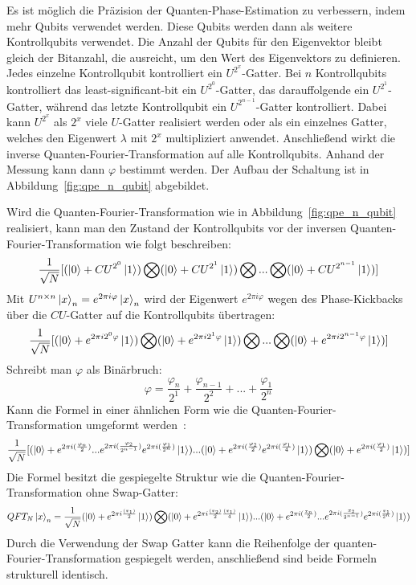 Es ist möglich die Präzision der Quanten-Phase-Estimation zu verbessern, 
indem mehr Qubits verwendet werden.
Diese Qubits werden dann als weitere Kontrollqubits verwendet.
Die Anzahl der Qubits für den Eigenvektor bleibt gleich der Bitanzahl, 
die ausreicht, um den Wert des Eigenvektors zu definieren.
Jedes einzelne Kontrollqubit kontrolliert ein \(U^{2^x}\)-Gatter.
Bei \(n\) Kontrollqubits kontrolliert das least-significant-bit ein \(U^{2^0}\)-Gatter,
das darauffolgende ein \(U^{2^1}\)-Gatter,
während das letzte Kontrollqubit ein \(U^{2^{n-1}}\)-Gatter kontrolliert.
Dabei kann \(U^{2^x}\) als \(2^x\) viele \(U\)-Gatter realisiert werden oder 
als ein einzelnes Gatter, welches den Eigenwert \(\lambda\) mit \(2^x\) multipliziert anwendet.
Anschließend wirkt die inverse Quanten-Fourier-Transformation auf alle Kontrollqubits.
Anhand der Messung kann dann \(\varphi\) bestimmt werden.
Der Aufbau der Schaltung ist in Abbildung~\ref{fig:qpe_n_qubit} abgebildet.

Wird die Quanten-Fourier-Transformation wie in Abbildung~\ref{fig:qpe_n_qubit} realisiert,
kann man den Zustand der Kontrollqubits vor der inversen Quanten-Fourier-Transformation wie folgt beschreiben:
\[\frac{1}{\sqrt{N}}[
  (\ket{0} + CU^{2^0}\ket{1}) \bigotimes
  (\ket{0} + CU^{2^1}\ket{1}) \bigotimes 
  ... \bigotimes
  (\ket{0} + CU^{2^{n-1}}\ket{1}) 
]\]
Mit \(U^{n\times n}\ket{x}_n=e^{2\pi i \varphi}\ket{x}_n\) wird der Eigenwert \(e^{2\pi i \varphi}\) wegen des Phase-Kickbacks
über die \(CU\)-Gatter auf die Kontrollqubits übertragen:
\[\frac{1}{\sqrt{N}}[
  (\ket{0} + e^{2\pi i 2^0 \varphi}\ket{1}) \bigotimes
  (\ket{0} + e^{2\pi i 2^1 \varphi}\ket{1}) \bigotimes 
  ... \bigotimes
  (\ket{0} + e^{2\pi i 2^{n-1} \varphi}\ket{1}) 
]\]
Schreibt man \(\varphi\) als Binärbruch:
\[\varphi = \frac{\varphi_n}{2^1} + \frac{\varphi_{n-1}}{2^2} + ... + \frac{\varphi_1}{2^n}\]
Kann die Formel in einer ähnlichen Form wie die Quanten-Fourier-Transformation umgeformt werden~\cite{nielsen_chuang_2010}:
\[\frac{1}{\sqrt{N}}[
  (\ket{0} + e^{2\pi i (\frac{\varphi_n}{2})} ... e^{2\pi i (\frac{\varphi_2}{2^{n-1}})}e^{2\pi i (\frac{\varphi_1}{2^{n}})}\ket{1})  ... 
  (\ket{0} +  e^{2\pi i (\frac{\varphi_2}{2})}e^{2\pi i (\frac{\varphi_1}{4})}\ket{1}) \bigotimes 
  (\ket{0} + e^{2\pi i (\frac{\varphi_1}{2})}\ket{1}) 
]\]
Die Formel besitzt die gespiegelte Struktur wie die Quanten-Fourier-Transformation ohne Swap-Gatter:
\[QFT_{N}\ket{x}_{n} = \frac{1}{\sqrt{N}}(\ket{0} + { e^{2 \pi i \frac{(x_1)}{2}}}\ket{1}) \bigotimes
( \ket{0} + { e^{2 \pi i \frac{(x_2)}{2}\frac{(x_1)}{4}}}\ket{1})...
(\ket{0} + e^{2\pi i (\frac{x_n}{2})} ... e^{2\pi i (\frac{x_2}{2^{n-1}})}e^{2\pi i (\frac{x_1}{2^{n}})}\ket{1})\]
Durch die Verwendung der Swap Gatter kann die Reihenfolge der quanten-Fourier-Transformation gespiegelt werden, 
anschließend sind beide Formeln strukturell identisch.

